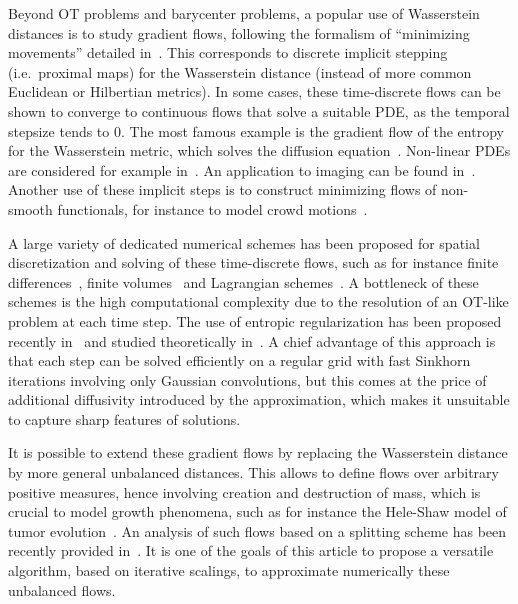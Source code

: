 Beyond OT problems and barycenter problems, a popular use of Wasserstein distances is to study gradient flows, following the formalism of ``minimizing movements'' detailed in~\cite{ambrosio2006gradient}. This corresponds to discrete implicit stepping (i.e.\ proximal maps) for the Wasserstein distance (instead of more common Euclidean or Hilbertian metrics). In some cases, these time-discrete flows can be shown to converge to continuous flows that solve a suitable PDE, as the temporal stepsize tends to 0. The most famous example is the gradient flow of the entropy for the Wasserstein metric, which solves the diffusion equation~\cite{jordan1998variational}. Non-linear PDEs are considered for example in~\cite{otto2001geometry}. An application to imaging can be found in~\cite{Burger-JKO}. Another use of these implicit steps is to construct minimizing flows of non-smooth functionals, for instance to model crowd motions~\cite{maury2010macroscopic}. 

A large variety of dedicated numerical schemes has been proposed for spatial discretization and solving of these time-discrete flows, such as for instance finite differences~\cite{burger2010mixed}, finite volumes~\cite{CarrilloFiniteVolume} and Lagrangian schemes~\cite{JDB-JKO}. A bottleneck of these schemes is the high computational complexity due to the resolution of an OT-like problem at each time step. The use of entropic regularization has been proposed recently in~\cite{2015-Peyre-siims} and studied theoretically in~\cite{2015-carlier-convergence}. A chief advantage of this approach is that each step can be solved efficiently on a regular grid with fast Sinkhorn iterations involving only Gaussian convolutions, but this comes at the price of additional diffusivity introduced by the approximation, which makes it unsuitable to capture sharp features of solutions. 

It is possible to extend these gradient flows by replacing the Wasserstein distance by more general unbalanced distances. This allows to define flows over arbitrary positive measures, hence involving creation and destruction of mass, which is crucial to model growth phenomena, such as for instance the Hele-Shaw model of tumor evolution~\cite{PerthameTumor}. An analysis of such flows based on a splitting scheme has been recently provided in~\cite{GallouetMonsaingeon2015}. It is one of the goals of this article to propose a versatile algorithm, based on iterative scalings, to approximate numerically these unbalanced flows.




